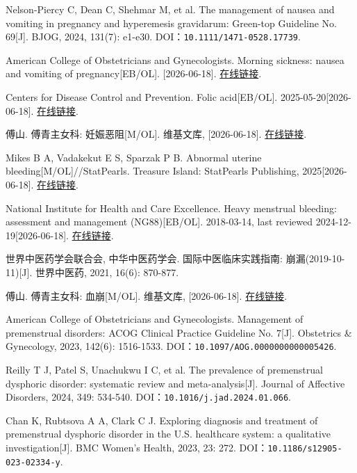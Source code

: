 \begin{enumerate}[label={[Q\arabic*]},leftmargin=*]
  \item Nelson-Piercy C, Dean C, Shehmar M, et al. The management of nausea and vomiting in pregnancy and hyperemesis gravidarum: Green-top Guideline No. 69[J]. BJOG, 2024, 131(7): e1-e30. DOI：\nolinkurl{10.1111/1471-0528.17739}.
  \item American College of Obstetricians and Gynecologists. Morning sickness: nausea and vomiting of pregnancy[EB/OL]. [2026-06-18]. \href{https://www.acog.org/womens-health/faqs/morning-sickness-nausea-and-vomiting-of-pregnancy}{在线链接}.
  \item Centers for Disease Control and Prevention. Folic acid[EB/OL]. 2025-05-20[2026-06-18]. \href{https://www.cdc.gov/folic-acid/index.html}{在线链接}.
  \item 傅山. 傅青主女科: 妊娠恶阻[M/OL]. 维基文库, [2026-06-18]. \href{https://zh.wikisource.org/zh-hans/傅青主女科}{在线链接}.
  \item Mikes B A, Vadakekut E S, Sparzak P B. Abnormal uterine bleeding[M/OL]//StatPearls. Treasure Island: StatPearls Publishing, 2025[2026-06-18]. \href{https://www.ncbi.nlm.nih.gov/books/NBK532913/}{在线链接}.
  \item National Institute for Health and Care Excellence. Heavy menstrual bleeding: assessment and management (NG88)[EB/OL]. 2018-03-14, last reviewed 2024-12-19[2026-06-18]. \href{https://www.nice.org.uk/guidance/ng88}{在线链接}.
  \item 世界中医药学会联合会, 中华中医药学会. 国际中医临床实践指南: 崩漏(2019-10-11)[J]. 世界中医药, 2021, 16(6): 870-877.
  \item 傅山. 傅青主女科: 血崩[M/OL]. 维基文库, [2026-06-18]. \href{https://zh.wikisource.org/zh-hans/傅青主女科}{在线链接}.
  \item American College of Obstetricians and Gynecologists. Management of premenstrual disorders: ACOG Clinical Practice Guideline No. 7[J]. Obstetrics \& Gynecology, 2023, 142(6): 1516-1533. DOI：\nolinkurl{10.1097/AOG.0000000000005426}.
  \item Reilly T J, Patel S, Unachukwu I C, et al. The prevalence of premenstrual dysphoric disorder: systematic review and meta-analysis[J]. Journal of Affective Disorders, 2024, 349: 534-540. DOI：\nolinkurl{10.1016/j.jad.2024.01.066}.
  \item Chan K, Rubtsova A A, Clark C J. Exploring diagnosis and treatment of premenstrual dysphoric disorder in the U.S. healthcare system: a qualitative investigation[J]. BMC Women's Health, 2023, 23: 272. DOI：\nolinkurl{10.1186/s12905-023-02334-y}.

\end{enumerate}
